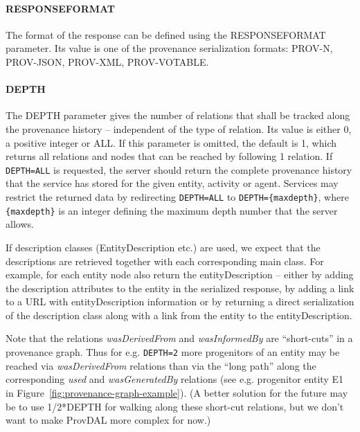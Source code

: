 \paragraph{RESPONSEFORMAT}
The format of the response can be defined using the RESPONSEFORMAT parameter. Its value is one of the provenance serialization formats: PROV-N, PROV-JSON, PROV-XML, PROV-VOTABLE.

\paragraph{{DEPTH}}
The DEPTH parameter gives the number of relations that shall be tracked along
the provenance history -- independent of the type of relation. Its value is
either 0, a positive integer or ALL. If this parameter is omitted,
the default is 1, which returns all relations and nodes that can be reached
by following 1 relation. If \texttt{DEPTH=ALL} is requested, the server should
return the complete provenance history that the service has stored for the
given entity, activity or agent.
Services may restrict the returned data by
redirecting \texttt{DEPTH=ALL} to \texttt{DEPTH=\{maxdepth\}}, where
\texttt{\{maxdepth\}} is an integer defining the maximum depth number that
the server allows.

If description classes (EntityDescription etc.) are used, we expect that the descriptions are retrieved together with each corresponding main class. For example, for each entity node also return the entityDescription -- either by adding the description attributes to the entity in the serialized response, by adding a link to a URL with entityDescription information or by returning a
direct serialization of the description class along with a link from the entity to the entityDescription.


Note that the relations \emph{wasDerivedFrom} and \emph{wasInformedBy} are ``short-cuts''
in a provenance graph. Thus for e.g. \texttt{DEPTH=2} more progenitors of an entity may
be reached via \emph{wasDerivedFrom} relations than via the ``long path'' along the
corresponding \emph{used} and \emph{wasGeneratedBy} relations (see e.g. progenitor entity E1 in
Figure~\ref{fig:provenance-graph-example}).
(A better solution for the future may be to use 1/2*DEPTH for walking along these short-cut relations, but we don't want to make ProvDAL more complex for now.)

